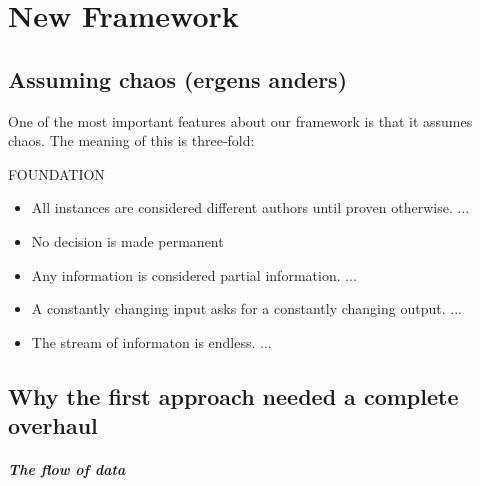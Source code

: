 \chapter{New Framework}

\section{Assuming chaos (ergens anders)}

One of the most important features about our framework is that it assumes chaos. The meaning of this is three-fold:

FOUNDATION

\begin{itemize}

\item All instances are considered different authors until proven otherwise. ...

\item No decision is made permanent

\item Any information is considered partial information. ...

\item A constantly changing input asks for a constantly changing output. ... %

\item The stream of informaton is endless. ... %

\end{itemize}

\section{Why the first approach needed a complete overhaul}




\paragraph{The flow of data} %

